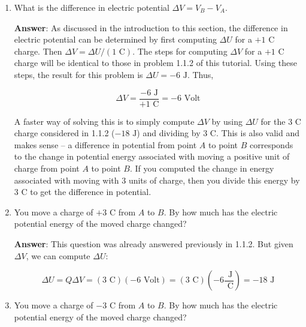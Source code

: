 \documentclass{article}
\begin{document}
\begin{enumerate}

  \item What is the difference in electric potential $\Delta V = V_B-V_A$.

        \ifsolutions
          \textbf{Answer}: As discussed in the introduction to this section, the difference in electric potential can be determined by first computing $\Delta U$ for a $+1\text{ C}$ charge. Then $\Delta V = \Delta U/(1\text{ C})$. The steps for computing $\Delta V$ for a $+1\text{ C}$ charge will be identical to those in problem 1.1.2 of this tutorial. Using these steps, the result for this problem is $\Delta U=-6\text{ J}$. Thus,
        
          \begin{equation}
        \Delta V = \frac{-6\text{ J}}{+1\text{ C}}= -6\text{ Volt}
        \end{equation}
        
          A faster way of solving this is to simply compute $\Delta V$ by using $\Delta U$ for the $3\text{ C}$ charge considered in 1.1.2 ($-18\text{ J}$) and dividing by $3\text{ C}$. This is also valid and makes sense -- a difference in potential from point $A$ to point $B$ corresponds to the change in potential energy associated with moving a positive unit of charge from point $A$ to point $B$. If you computed the change in energy associated with moving with 3 units of charge, then you divide this energy by $3\text{ C}$ to get the difference in potential.
        \else
          \vskip 48pt
        \fi

  \item You move a charge of $+3\text{ C}$ from $A$ to $B$. By how much has the electric potential energy of the moved charge changed?

        \ifsolutions
          \textbf{Answer}: This question was already answered previously in 1.1.2. But given $\Delta V$, we can compute $\Delta U$:
        
          \begin{equation}
        \Delta U = Q\Delta V=(3\text{ C})(-6\text{ Volt})=(3\text{ C})\left(-6\frac{\text{ J}}{ \text{ C}}\right)=-18\text{ J}
        \end{equation}
        \else
          \vskip 48pt
        \fi

  \item You move a charge of $-3\text{ C}$ from $A$ to $B$. By how much has the electric potential energy of the moved charge changed?


\end{enumerate}
\end{document}

